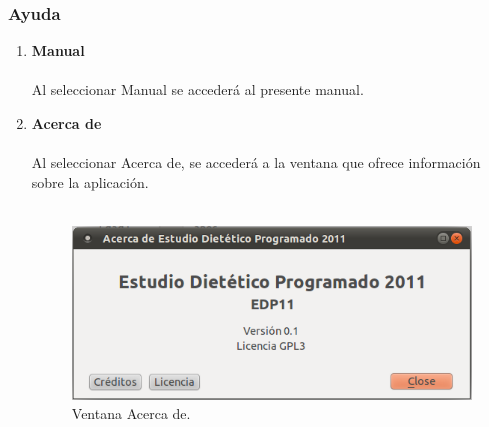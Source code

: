 \subsubsection{Ayuda}
\begin{enumerate}
\item \textbf{Manual}\\\\
Al seleccionar Manual se accederá al presente manual.\\
\item \textbf{Acerca de}\\\\
Al seleccionar Acerca de, se accederá a la ventana que ofrece información sobre la aplicación.\\\\
\begin{figure}[H]
  \label{acercade}
  \begin{center}
    \includegraphics[scale=0.5]{../../Image/acercade.png}
  \end{center}
  \caption{Ventana Acerca de.}
\end{figure}


\end{enumerate}
